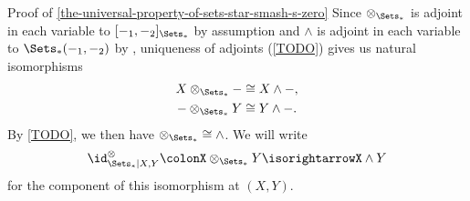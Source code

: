 \begin{Proof}{Proof of \cref{the-universal-property-of-sets-star-smash-s-zero}}
    Since $\otimes_{\Sets_{*}}$ is adjoint in each variable to $[-_{1},-_{2}]_{\Sets_{*}}$ by assumption and $\wedge$ is adjoint in each variable to $\Sets_{*}(-_{1},-_{2})$ by , uniqueness of adjoints (\cref{TODO}) gives us natural isomorphisms
    \begin{align*}
        X\otimes_{\Sets_{*}}- &\cong X\wedge-,\\
        -\otimes_{\Sets_{*}}Y &\cong Y\wedge-.
    \end{align*}
    By \cref{TODO}, we then have $\mathord{\otimes_{\Sets_{*}}}\cong\mathord{\wedge}$. We will write
    \[
        \id^{\otimes}_{\Sets_{*}|X,Y}%
        \colon%
        X\otimes_{\Sets_{*}}Y%
        \isorightarrow%
        X\wedge Y%
    \]%
    for the component of this isomorphism at $(X,Y)$.


\end{Proof}
